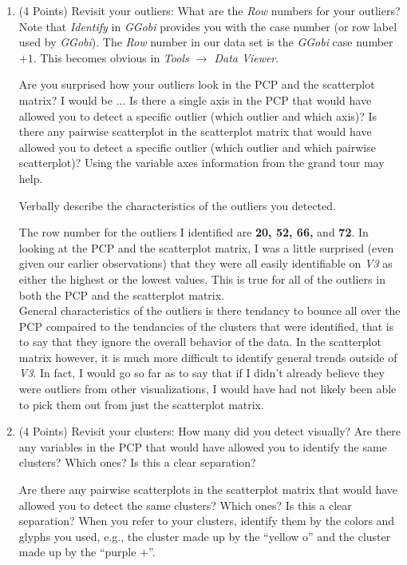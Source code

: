 \documentclass[12pt,letterpaper,final]{article}
\begin{document}
\begin{enumerate}
\begin{enumerate}
\item (4 Points)
Revisit your outliers: What are the {\it Row} numbers for your outliers?
Note that {\it Identify} in {\it GGobi} provides you with the case number 
(or row label used by {\it GGobi}).
The {\it Row} number in our data set is the {\it GGobi} case number $+ 1$.
This becomes obvious in {\it Tools $\rightarrow$ Data Viewer}. 

Are you surprised how your outliers look in the PCP and the scatterplot matrix?
I would be $\ldots$ Is there a single axis in the PCP that would have
allowed you to detect a specific outlier (which outlier and which axis)? 
Is there any pairwise scatterplot in the scatterplot matrix that would have
allowed you to detect a specific outlier (which outlier and which pairwise scatterplot)? 
Using the variable axes information from the grand tour may help.

Verbally describe the characteristics of the outliers you detected. 

{\scriptsize
  The row number for the outliers I identified are {\bf 20, 52, 66,} and {\bf 72}.  In looking at the PCP and the scatterplot matrix, I was a little surprised (even given our earlier observations) that they were all easily identifiable on {\it V3} as either the highest or the lowest values.  This is true for all of the outliers in both the PCP and the scatterplot matrix.\\
  
  General characteristics of the outliers is there tendancy to bounce all over the PCP compaired to the tendancies of the clusters that were identified, that is to say that they ignore the overall behavior of the data.  In the scatterplot matrix however, it is much more difficult to identify general trends outside of {\it V3}.  In fact, I would go so far as to say that if I didn't already believe they were outliers from other visualizations, I would have had not likely been able to pick them out from just the scatterplot matrix.

}


\item (4 Points)
Revisit your clusters: How many did you detect visually?
Are there any variables in the PCP that would have allowed you
to identify the same clusters? Which ones? Is this a clear separation?

Are there any pairwise scatterplots in the scatterplot matrix that would have
allowed you to detect the same clusters? Which ones? Is this a clear separation?
When you refer to your clusters, identify them by the colors and glyphs
you used, e.g., the cluster made up by the ``yellow o'' and the cluster 
made up by the ``purple $+$''. 


\end{enumerate}
\end{enumerate}
\end{document}
